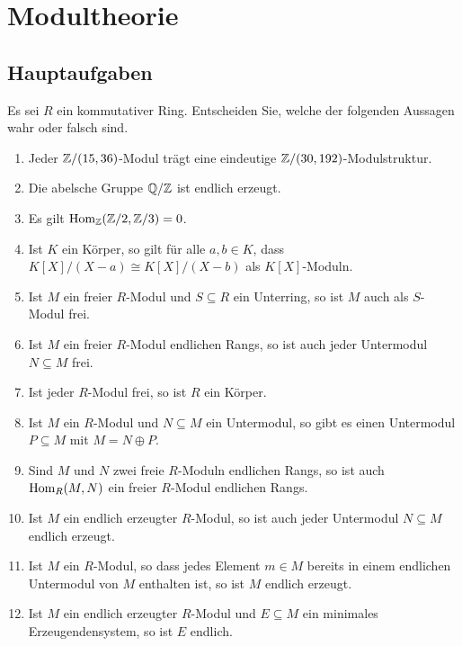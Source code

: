 \section{Modultheorie}





\subsection{Hauptaufgaben}


\begin{question}[subtitle = Wahr oder Falsch?]
  Es sei $R$ ein kommutativer Ring.
  Entscheiden Sie, welche der folgenden Aussagen wahr oder falsch sind.
  \begin{enumerate}
    \item
      Jeder $\mathbb{Z}/(15,36)$-Modul trägt eine eindeutige $\mathbb{Z}/(30,192)$-Modulstruktur.
    \item
      Die abelsche Gruppe $\mathbb{Q}/\mathbb{Z}$ ist endlich erzeugt.
    \item
      Es gilt $\operatorname{Hom}_{\mathbb{Z}}(\mathbb{Z}/2, \mathbb{Z}/3) = 0$.
    \item
      Ist $K$ ein Körper, so gilt für alle $a, b \in K$, dass $K[X]/(X-a) \cong K[X]/(X-b)$ als $K[X]$-Moduln.
    \item
      Ist $M$ ein freier $R$-Modul und $S \subseteq R$ ein Unterring, so ist $M$ auch als $S$-Modul frei.
    \item
      Ist $M$ ein freier $R$-Modul endlichen Rangs, so ist auch jeder Untermodul $N \subseteq M$ frei.
    \item
      Ist jeder $R$-Modul frei, so ist $R$ ein Körper.
    \item
      Ist $M$ ein $R$-Modul und $N \subseteq M$ ein Untermodul, so gibt es einen Untermodul $P \subseteq M$ mit $M = N \oplus P$.
    \item
      Sind $M$ und $N$ zwei freie $R$-Moduln endlichen Rangs, so ist auch $\operatorname{Hom}_R(M, N)$ ein freier $R$-Modul endlichen Rangs.
    \item
      Ist $M$ ein endlich erzeugter $R$-Modul, so ist auch jeder Untermodul $N \subseteq M$ endlich erzeugt.
    \item
      Ist $M$ ein $R$-Modul, so dass jedes Element $m \in M$ bereits in einem endlichen Untermodul von $M$ enthalten ist, so ist $M$ endlich erzeugt.
    \item
      Ist $M$ ein endlich erzeugter $R$-Modul und $E \subseteq M$ ein minimales Erzeugendensystem, so ist $E$ endlich.

\end{enumerate}
\end{question}
